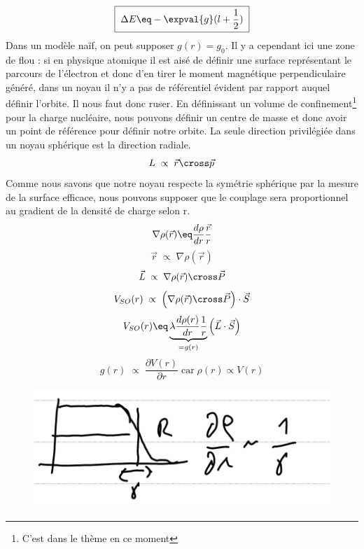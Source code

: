 \begin{equation*}
\boxed{
    \;\Delta E \eq -\expval{g}(l+\frac{1}{2})\;
    }
\end{equation*}
Dans un modèle naïf, on peut supposer $g(r) = g_0$.
Il y a cependant ici une zone de flou : si en physique atomique il est aisé de définir une surface représentant le parcours de l'électron et donc d'en tirer le moment magnétique perpendiculaire généré, dans un noyau il n'y a pas de référentiel évident par rapport auquel définir l'orbite. Il nous faut donc ruser. En définissant un volume de confinement\footnote{C'est dans le thème en ce moment} pour la charge nucléaire, nous pouvons définir un centre de masse et donc avoir un point de référence pour définir notre orbite. La seule direction privilégiée dans un noyau sphérique est la direction radiale.
\begin{equation*}
    L \; \propto\; \vec{r}\cross \vec{p}
\end{equation*}
Comme nous savons que notre noyau respecte la symétrie sphérique par la mesure de la surface efficace, nous pouvons supposer que le couplage sera proportionnel au gradient de la densité de charge selon r.
\begin{equation*}
    \nabla \rho(\vec{r}) \eq \dfrac{d\rho}{dr}\frac{\vec{r}}{r}
\end{equation*}
\begin{equation*}
    \vec{r} \; \propto \; \nabla \rho(\vec{r})
\end{equation*}
\begin{equation*}
    \vec{L}\;\propto\; \nabla \rho(\vec{r})\cross \vec{P}
\end{equation*}
\begin{equation*}
    V_{SO}(r) \; \propto \; \Big(\nabla \rho(\vec{r})\cross \vec{P}\Big)\cdot \vec{S}
\end{equation*}
\begin{equation*}
    V_{SO}(r) \eq\underbrace{  \lambda\dfrac{d\rho(r)}{dr}\frac{1}{r}}_{= g(r)}\Big(\vec{L}\cdot \vec{S}\Big)
\end{equation*}
\begin{equation*}
    g(r) \;\propto\; \dfrac{\partial V(r)}{\partial r} \; \text{car}\; \rho(r) \propto V(r)
\end{equation*}
\begin{figure}[H]
    \centering
    \includegraphics{Images4/facteur_gamma.PNG}
\end{figure}
